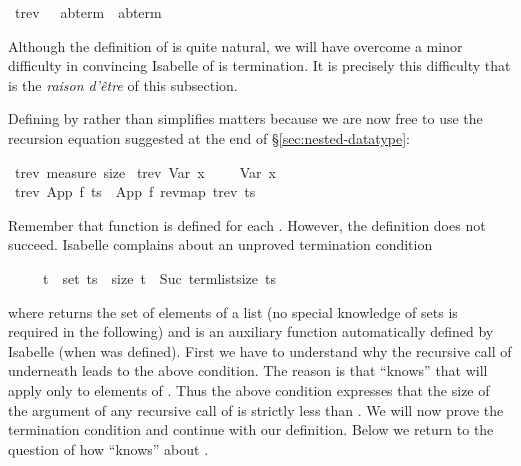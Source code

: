 %
\begin{isabellebody}%
\def\isabellecontext{Nested1}%
\ trev\ \ {\isacharcolon}{\isacharcolon}\ {\isachardoublequote}{\isacharparenleft}{\isacharprime}a{\isacharcomma}{\isacharprime}b{\isacharparenright}term\ {\isasymRightarrow}\ {\isacharparenleft}{\isacharprime}a{\isacharcomma}{\isacharprime}b{\isacharparenright}term{\isachardoublequote}%
\begin{isamarkuptext}%
\noindent
Although the definition of  is quite natural, we will have
overcome a minor difficulty in convincing Isabelle of is termination.
It is precisely this difficulty that is the \textit{raison d'\^etre} of
this subsection.

Defining  by  rather than 
simplifies matters because we are now free to use the recursion equation
suggested at the end of \S\ref{sec:nested-datatype}:%
\end{isamarkuptext}%
\ trev\ {\isachardoublequote}measure\ size{\isachardoublequote}\isanewline
\ {\isachardoublequote}trev\ {\isacharparenleft}Var\ x{\isacharparenright}\ \ \ \ {\isacharequal}\ Var\ x{\isachardoublequote}\isanewline
\ {\isachardoublequote}trev\ {\isacharparenleft}App\ f\ ts{\isacharparenright}\ {\isacharequal}\ App\ f\ {\isacharparenleft}rev{\isacharparenleft}map\ trev\ ts{\isacharparenright}{\isacharparenright}{\isachardoublequote}%
\begin{isamarkuptext}%
\noindent
Remember that function  is defined for each .
However, the definition does not succeed. Isabelle complains about an
unproved termination condition
\begin{isabelle}%
\ \ \ \ \ t\ {\isasymin}\ set\ ts\ {\isasymlongrightarrow}\ size\ t\ {\isacharless}\ Suc\ {\isacharparenleft}term{\isacharunderscore}list{\isacharunderscore}size\ ts{\isacharparenright}%
\end{isabelle}
where  returns the set of elements of a list (no special
knowledge of sets is required in the following) and  is an auxiliary function automatically defined by Isabelle
(when  was defined).  First we have to understand why the
recursive call of  underneath  leads to the above
condition. The reason is that  ``knows'' that 
will apply  only to elements of . Thus the above
condition expresses that the size of the argument  of any
recursive call of  is strictly less than .  We will now prove the termination condition and
continue with our definition.  Below we return to the question of how
 ``knows'' about .%
\end{isamarkuptext}%
\end{isabellebody}%
